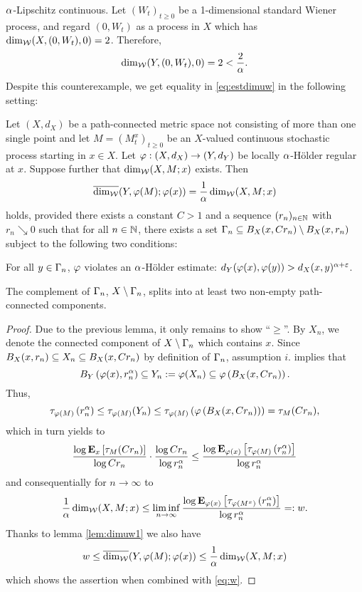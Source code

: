 $\ga$-Lipschitz continuous. Let $(W_t)_{t\geq0}$ be a 1-dimensional standard Wiener process, and regard $(0,W_t)$ as a process in $X$ which has $\dimw(X,(0,W_t),0)=2$. Therefore,
\[
  \dimw(Y,(0,W_t),0)=2<\frac{2}{\ga}.
\]
Despite this counterexample, we get equality in \eqref{eq:estdimuw} in the following setting:
\begin{lem}\label{lem:dimuw2}
  Let $(X,d_X)$ be a path-connected metric space not consisting of more than one single point and let $M=(M_t^x)_{t\geq0}$ be an $X$-valued continuous stochastic process starting in $x\in X$. Let 
  $\gp:(X,d_X)\to(Y,d_Y)$ be locally $\ga$-H\"older regular at $x$. Suppose further that $\dimw(X,M;x)$ exists. Then
  \[
    \dimuw(Y,\gp(M);\gp(x))=\frac{1}{\ga}\dimw(X,M;x)
  \]
  holds, provided there exists a constant $C>1$ and a sequence 
  $(r_n)_{n\in\IN}$ with $r_n\searrow 0$ such that for all $n\in\IN$, there exists a set $\gC_n\ssq B_X(x,Cr_n)\setminus B_X(x,r_n)$ subject to the following two conditions:
  \begin{compactenum}[i.]
    \item For all $y\in\gC_n$, $\gp$ violates an $\ga$-H\"older estimate: 
    $d_Y(\gp(x),\gp(y))>d_X(x,y)^{\ga+\gep}$.
    \item The complement of $\gC_n$, $X\setminus\gC_n$, splits into at least two non-empty path-connected components. 
  \end{compactenum}
\end{lem}
\begin{proof}
  Due to the previous lemma, it only remains to show ``$\geq$''. By 
  $X_n$, we denote the connected component of $X\setminus\gC_n$ which contains $x$. Since $B_X(x,r_n)\ssq X_n \ssq B_X(x,Cr_n)$ by definition of $\gC_n$, assumption $i.$ implies that
  \[
    B_Y\left(\gp(x),r_n^{\ga}\right)
    \ssq Y_n:=\gp(X_n)
    \ssq \gp\left(B_X(x,Cr_n)\right).
  \]
  Thus, 
  \[
    \tau_{\gp(M)}\left(r_n^{\ga}\right)
    \leq \tau_{\gp(M)}(Y_n)
    \leq \tau_{\gp(M)}\left(\gp\left(B_X(x,Cr_n)\right)\right)
    =\tau_M(Cr_n),
  \]
  which in turn yields to
  \[
    \frac{\log\PTEp{\tau_M(Cr_n)}{x}}{\log Cr_n}
      \cdot\frac{\log Cr_n}{\log r_n^{\ga}}
    \leq \frac{\log\PTEp{\tau_{\gp(M)}\left(r_n^{\ga}\right)}{\gp(x)}}
      {\log r_n^{\ga}}
  \]
  and consequentially for $n\to\infty$ to
  \begin{equation}\label{eq:w}
    \frac{1}{\ga}\dimw(X,M;x)\leq \liminf_{n\to\infty}
    \frac{\log\PTEp{\tau_{\gp(M^x)}\left(r_n^{\ga}\right)}{\gp(x)}}
      {\log r_n^{\ga}}=: w.
  \end{equation}
  Thanks to lemma \ref{lem:dimuw1} we also have 
  \[
    w\leq \dimuw(Y,\gp(M);\gp(x))\leq \frac{1}{\ga}\dimw(X,M;x)
  \]
  which shows the assertion when combined with \eqref{eq:w}.
\end{proof}
